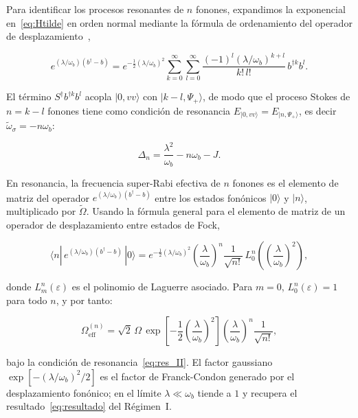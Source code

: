 Para identificar los procesos resonantes de $n$ fonones, expandimos la exponencial en~\eqref{eq:Htilde} en orden normal mediante la fórmula de ordenamiento del operador de desplazamiento~\cite{cahill1969},

\begin{equation}
	e^{(\lambda/\omega_b)(b^\dagger - b)}
	= e^{-\frac{1}{2}(\lambda/\omega_b)^2}
	\sum_{k=0}^\infty\sum_{l=0}^\infty
	\frac{(-1)^l(\lambda/\omega_b)^{k+l}}{k!\,l!}\,b^{\dagger k} b^l.
	\label{eq:BCH}
\end{equation}

El término $S^\dagger b^{\dagger k}b^l$ acopla $|0,vv\rangle$ con $|k-l,\Psi_+\rangle$, de modo que el proceso Stokes de $n = k - l$ fonones tiene como condición de resonancia $E_{|0,vv\rangle} = E_{|n,\Psi_+\rangle}$, es decir $\widetilde\omega_\sigma = -n\omega_b$:

\begin{equation}
	\Delta_n = \frac{\lambda^2}{\omega_b} - n\omega_b - J.
	\label{eq:res_II}
\end{equation}

En resonancia, la frecuencia super-Rabi efectiva de $n$ fonones es el elemento de matriz del operador $e^{(\lambda/\omega_b)(b^\dagger - b)}$ entre los estados fonónicos $|0\rangle$ y $|n\rangle$, multiplicado por $\widetilde\Omega$. Usando la fórmula general para el elemento de matriz de un operador de desplazamiento entre estados de Fock,

\begin{equation}
	\langle n|\,e^{(\lambda/\omega_b)(b^\dagger - b)}\,|0\rangle
	= e^{-\frac{1}{2}(\lambda/\omega_b)^2}
	\left(\frac{\lambda}{\omega_b}\right)^{\!n}
	\frac{1}{\sqrt{n!}}\,L_0^n\!\left(\!\left(\frac{\lambda}{\omega_b}\right)^{\!2}\right),
	\label{eq:elem_mat}
\end{equation}

donde $L_m^n(\varepsilon)$ es el polinomio de Laguerre asociado. Para $m=0$, $L_0^n(\varepsilon) = 1$ para todo $n$, y por tanto:

\begin{equation}
	\boxed{
		\Omega_\mathrm{eff}^{(n)}
		= \sqrt{2}\,\Omega\,
		\exp\!\left[-\frac{1}{2}\!\left(\frac{\lambda}{\omega_b}\right)^{\!2}\right]
		\left(\frac{\lambda}{\omega_b}\right)^{\!n}
		\frac{1}{\sqrt{n!}},
	}
	\label{eq:resultado_II}
\end{equation}

bajo la condición de resonancia~\eqref{eq:res_II}. El factor gaussiano $\exp[-(\lambda/\omega_b)^2/2]$ es el factor de Franck-Condon generado por el desplazamiento fonónico; en el límite $\lambda \ll \omega_b$ tiende a $1$ y recupera el resultado~\eqref{eq:resultado} del Régimen~I.


